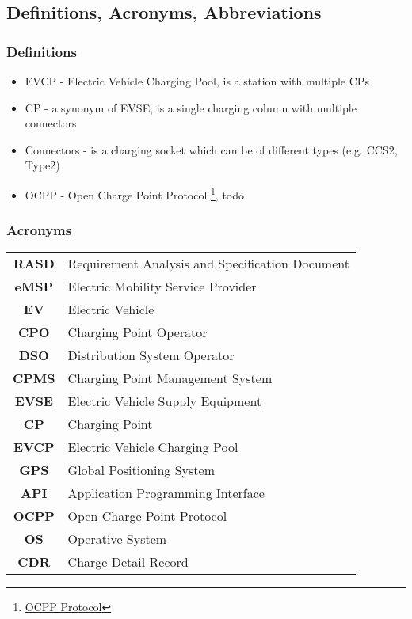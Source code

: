 \subsection{Definitions, Acronyms, Abbreviations}

\subsubsection{Definitions}
\begin{itemize}
    \item EVCP - Electric Vehicle Charging Pool, is a station with multiple CPs
    \item CP - a synonym of EVSE, is a single charging column with multiple connectors
    \item Connectors - is a charging socket which can be of different types (e.g. CCS2, Type2)
    \item OCPP - Open Charge Point Protocol \footnote{\href{https://www.openchargealliance.org/protocols/ocpp-201/}{OCPP Protocol}}, todo
\end{itemize}

\subsubsection{Acronyms}
\begin{table}[H]
    \begin{tabularx}{\textwidth}{cX}
        \toprule
        \textbf{RASD} & Requirement Analysis and Specification Document \\
        \textbf{eMSP} & Electric Mobility Service Provider              \\
        \textbf{EV}   & Electric Vehicle                                \\
        \textbf{CPO}  & Charging Point Operator                         \\
        \textbf{DSO}  & Distribution System Operator                    \\
        \textbf{CPMS} & Charging Point Management System                \\
        \textbf{EVSE} & Electric Vehicle Supply Equipment               \\
        \textbf{CP}   & Charging Point                                  \\
        \textbf{EVCP} & Electric Vehicle Charging Pool                  \\
        \textbf{GPS}  & Global Positioning System                       \\
        \textbf{API}  & Application Programming Interface               \\
        \textbf{OCPP} & Open Charge Point Protocol                      \\
        \textbf{OS}   & Operative System                                \\
        \textbf{CDR}  & Charge Detail Record                            \\
        \bottomrule
    \end{tabularx}
\end{table}

